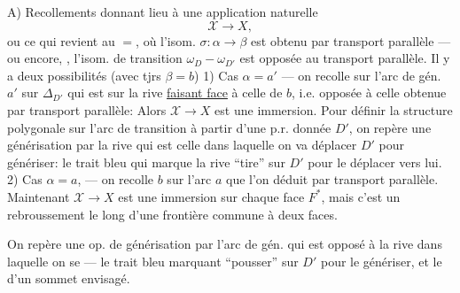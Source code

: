 A) Recollements donnant lieu à une application naturelle
\[\mathcal X\longrightarrow X,\]
ou ce qui revient au $=$, où l'isom. $\sigma:\alpha\longrightarrow\beta$  est obtenu par transport parallèle --- ou encore, ,  l'isom. de transition $\omega_D\mathbin{-}\omega_{D'}$ est opposée au transport parallèle. Il y a deux possibilités (avec tjrs $\beta=b$)
1) Cas $\alpha=a'$ --- on recolle    sur l'arc  de gén. $a'$ sur $\Delta_{D'}$ qui est sur la rive \uline{faisant face} à celle de $b$, i.e. opposée à celle obtenue par transport parallèle:  Alors $\mathcal X\longrightarrow X$ est une immersion. 
\margin{\unsure{*}}
Pour définir la structure polygonale sur l'arc de transition à partir d'une p.r. donnée $D'$, on repère  une générisation par la rive qui est  celle dans laquelle on va déplacer $D'$ pour génériser: le trait bleu qui marque la rive ``tire'' sur $D'$ pour le déplacer vers lui.
2) Cas $\alpha=a$, --- on recolle $b$ sur l'arc $a$ que l'on déduit par transport parallèle. Maintenant $\mathcal X\longrightarrow X$ est une immersion sur chaque face $F^*$, mais c'est un rebroussement le long d'une frontière commune à deux faces.

On repère une op. de générisation par  l'arc de gén. qui est opposé à la rive dans laquelle on se  --- le trait bleu marquant  ``pousser'' sur $D'$ pour le génériser, et le  d'un sommet envisagé.
